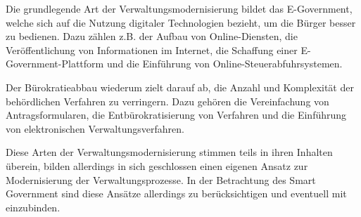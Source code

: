 Die grundlegende Art der Verwaltungsmodernisierung bildet das E-Government, welche sich auf die Nutzung digitaler Technologien bezieht, um die Bürger besser zu bedienen. 
Dazu zählen z.B. der Aufbau von Online-Diensten, die Veröffentlichung von Informationen im Internet, die Schaffung einer E-Government-Plattform und die Einführung von Online-Steuerabfuhrsystemen.
\par
Der Bürokratieabbau wiederum zielt darauf ab, die Anzahl und Komplexität der behördlichen Verfahren zu verringern. 
Dazu gehören die Vereinfachung von Antragsformularen, die Entbürokratisierung von Verfahren und die Einführung von elektronischen Verwaltungsverfahren.
\par
Diese Arten der Verwaltungsmodernisierung stimmen teils in ihren Inhalten überein, bilden allerdings in sich geschlossen einen eigenen Ansatz zur Modernisierung der Verwaltungsprozesse.
In der Betrachtung des Smart Government sind diese Ansätze allerdings zu berücksichtigen und eventuell mit einzubinden.
